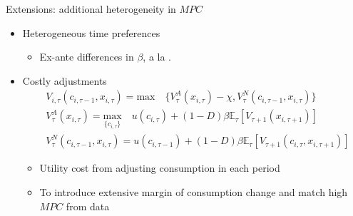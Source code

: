 \documentclass{beamer}
\begin{document}
\begin{frame}{Extensions: additional heterogeneity in $MPC$}
	
	\begin{itemize}
		\item Heterogeneous time preferences
		\begin{itemize}
			\item Ex-ante differences in $\beta$, a la \cite{krusell1998income,carroll2017distribution,krueger2016macroeconomics}.
		\end{itemize}
		\item Costly adjustments
		\begin{equation*}
			\begin{split}
				& V_{i,\tau}(c_{i,\tau-1},x_{i,\tau}) = \textrm{max} \quad \{V^A_{\tau}(x_{i,\tau})-\chi,V^N_{\tau}(c_{i,\tau-1},x_{i,\tau})\} \\
				& V^A_{\tau}(x_{i,\tau}) = \underset{\{c_{i,\tau}\}}{\textrm{max}} \quad u(c_{i,\tau}) + (1-D)\beta \mathbb{E}_{\tau}\left[V_{\tau+1}(x_{i,\tau+1})\right]  \\
				& V^N_{\tau}(c_{i,\tau-1},x_{i,\tau}) =  u(c_{i,\tau-1}) + (1-D)\beta \mathbb{E}_{\tau}\left[V_{\tau+1}(c_{i,\tau},x_{i,\tau+1})\right]
			\end{split}
		\end{equation*}
		\begin{itemize}
			\item Utility cost from adjusting consumption in each period
			\item To introduce extensive margin of consumption change and match high $MPC$ from data 
		\end{itemize}
	\end{itemize}
\end{frame}






\end{document}
